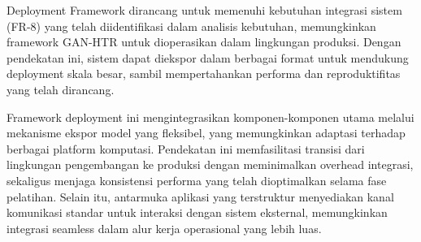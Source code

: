 \documentclass[12pt,a4paper]{article}
\begin{document}
Deployment Framework  dirancang untuk memenuhi kebutuhan integrasi sistem (FR-8) yang telah diidentifikasi dalam analisis kebutuhan, memungkinkan framework GAN-HTR untuk dioperasikan dalam lingkungan produksi. Dengan pendekatan ini, sistem dapat diekspor dalam berbagai format untuk mendukung deployment skala besar, sambil mempertahankan performa dan reproduktifitas yang telah dirancang.

Framework deployment ini mengintegrasikan komponen-komponen utama melalui mekanisme ekspor model yang fleksibel, yang memungkinkan adaptasi terhadap berbagai platform komputasi. Pendekatan ini memfasilitasi transisi dari lingkungan pengembangan ke produksi dengan meminimalkan overhead integrasi, sekaligus menjaga konsistensi performa yang telah dioptimalkan selama fase pelatihan. Selain itu, antarmuka aplikasi yang terstruktur menyediakan kanal komunikasi standar untuk interaksi dengan sistem eksternal, memungkinkan integrasi seamless dalam alur kerja operasional yang lebih luas.





\end{document}
